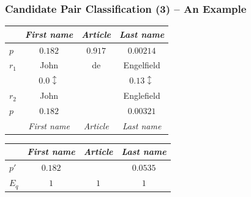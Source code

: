 \documentclass[12pt]{beamer}
\theoremstyle{break}
\begin{document}


\begin{frame}
	\frametitle{Candidate Pair Classification (3) -- An Example}

	\begin{center}

        \begin{tabular}{| l | c | c | c |}
            \cline{2-4}
            \multicolumn{1}{l|}{ } & \textit{First name} & \textit{Article} & \textit{Last name} \\\hline
            $p$ & $0.182$ & $0.917$ & $0.00214$ \\\hline
            $r_1$ & John & de & Engelfield \\\hline
            \multicolumn{1}{c}{ } & \multicolumn{1}{c}{$0.0 \updownarrow$} & \multicolumn{1}{c}{ } & \multicolumn{1}{c}{$0.13 \updownarrow$} \\\hline
            $r_2$ & John & & Englefield \\\hline
            $p$ & $0.182$ &  & $0.00321$\\\hline
            \multicolumn{1}{l|}{ } & \textit{First name} & \textit{Article} & \textit{Last name}\\\cline{2-4}
        \end{tabular}
	        
	    \bigskip
	    
        \begin{tabular}{| l | c | c | c |}
            \cline{2-4}
            \multicolumn{1}{l|}{ } & \textit{First name} & \textit{Article} & \textit{Last name} \\\hline
            $p'$ & $0.182$ & & $0.0535$ \\\hline
            $E_q$ & $1$ & $1$ & $1$\\\hline
        \end{tabular}
       
     \end{center}
	
\end{frame}


\end{document}
